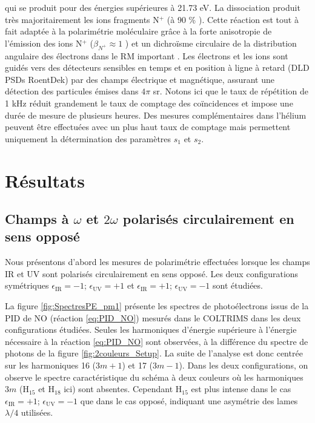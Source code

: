 qui se produit pour des énergies supérieures à 21.73 eV. La dissociation produit très majoritairement les ions fragments N$^+$ (à 90 \% ). Cette réaction est tout à fait adaptée à la polarimétrie moléculaire grâce à la forte anisotropie de  l'émission des ions N$^+$ ($\beta_{N^+} \approx 1$ ) et un dichroïsme circulaire de la distribution angulaire des électrons dans le RM important . Les électrons et les ions sont guidés vers des détecteurs sensibles en temps et en position à ligne à retard (DLD PSDs RoentDek) par des champs électrique et magnétique, assurant une détection des particules émises dans $4\pi$ sr. Notons ici que le taux de répétition de 1 kHz réduit grandement le taux de comptage des coïncidences et impose une durée de mesure de plusieurs heures. Des mesures complémentaires dans l'hélium peuvent être effectuées avec un plus haut taux de comptage mais permettent uniquement la détermination des paramètres $s_1$ et $s_2$.

\section{Résultats}
\subsection{Champs à $\omega$ et $2\omega$ polarisés circulairement en sens opposé}
Nous présentons d'abord les mesures de polarimétrie effectuées lorsque les champs IR et UV sont polarisés circulairement en sens opposé. Les deux configurations symétriques $\epsilon_{\text{IR}} = -1$; $\epsilon_{\text{UV}} = +1$ et $\epsilon_{\text{IR}} = +1$; $\epsilon_{\text{UV}} = -1$ sont étudiées.

La figure \ref{fig:SpectresPE_pm1} présente les spectres de photoélectrons issus de la PID de NO (réaction \ref{eq:PID_NO}) mesurés dans le COLTRIMS dans les deux configurations étudiées. Seules les harmoniques d'énergie supérieure à l'énergie nécessaire à la réaction \ref{eq:PID_NO} sont observées, à la différence du spectre de photons de la figure \ref{fig:2couleurs_Setup}. La suite de l'analyse est donc centrée sur les harmoniques 16 ($3m+1$) et 17 ($3m-1$). Dans les deux configurations, on observe le spectre caractéristique du schéma à deux couleurs où les harmoniques $3m$ (H$_{15}$ et H$_{18}$ ici) sont absentes. Cependant H$_{15}$ est plus intense dans le cas $\epsilon_{\text{IR}} = +1$; $\epsilon_{\text{UV}} = -1$ que dans le cas opposé, indiquant une asymétrie des lames $\lambda/4$ utilisées.

